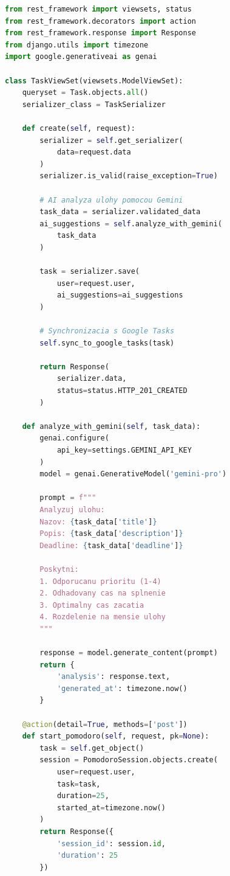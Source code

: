 \documentclass[10pt,twocolumn,twoside,slovak,a4paper]{article}
\begin{document}
\begin{lstlisting}[language=Python, caption=Django view pre vytvorenie ulohy]
from rest_framework import viewsets, status
from rest_framework.decorators import action
from rest_framework.response import Response
from django.utils import timezone
import google.generativeai as genai

class TaskViewSet(viewsets.ModelViewSet):
    queryset = Task.objects.all()
    serializer_class = TaskSerializer
    
    def create(self, request):
        serializer = self.get_serializer(
            data=request.data
        )
        serializer.is_valid(raise_exception=True)
        
        # AI analyza ulohy pomocou Gemini
        task_data = serializer.validated_data
        ai_suggestions = self.analyze_with_gemini(
            task_data
        )
        
        task = serializer.save(
            user=request.user,
            ai_suggestions=ai_suggestions
        )
        
        # Synchronizacia s Google Tasks
        self.sync_to_google_tasks(task)
        
        return Response(
            serializer.data,
            status=status.HTTP_201_CREATED
        )
    
    def analyze_with_gemini(self, task_data):
        genai.configure(
            api_key=settings.GEMINI_API_KEY
        )
        model = genai.GenerativeModel('gemini-pro')
        
        prompt = f"""
        Analyzuj ulohu:
        Nazov: {task_data['title']}
        Popis: {task_data['description']}
        Deadline: {task_data['deadline']}
        
        Poskytni:
        1. Odporucanu prioritu (1-4)
        2. Odhadovany cas na splnenie
        3. Optimalny cas zacatia
        4. Rozdelenie na mensie ulohy
        """
        
        response = model.generate_content(prompt)
        return {
            'analysis': response.text,
            'generated_at': timezone.now()
        }
    
    @action(detail=True, methods=['post'])
    def start_pomodoro(self, request, pk=None):
        task = self.get_object()
        session = PomodoroSession.objects.create(
            user=request.user,
            task=task,
            duration=25,
            started_at=timezone.now()
        )
        return Response({
            'session_id': session.id,
            'duration': 25
        })
\end{lstlisting}
\end{document}
